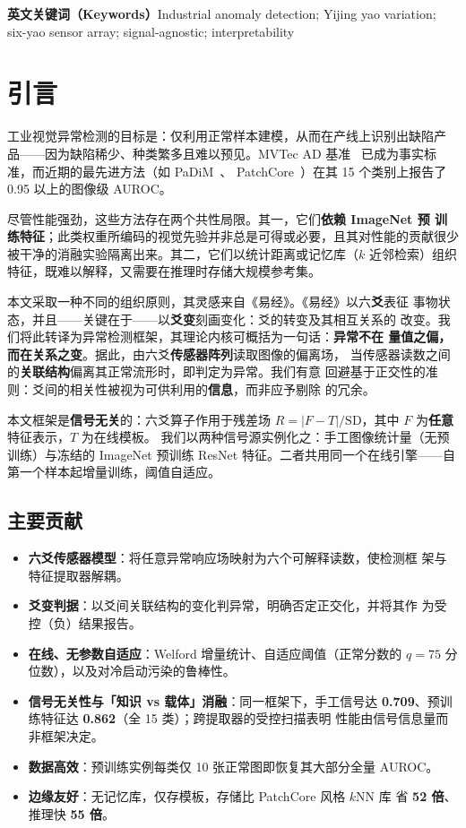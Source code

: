 \documentclass[journal,10pt]{IEEEtran}
\begin{document}
\noindent\textbf{英文关键词（Keywords）}\quad Industrial anomaly detection;
Yijing yao variation; six-yao sensor array; signal-agnostic; interpretability

\section{引言}
工业视觉异常检测的目标是：仅利用正常样本建模，从而在产线上识别出缺陷产
品——因为缺陷稀少、种类繁多且难以预见。MVTec AD 基准~\cite{bergmann2019mvtec}
已成为事实标准，而近期的最先进方法（如 PaDiM~\cite{defard2021padim}、
PatchCore~\cite{roth2022patchcore}）在其 15 个类别上报告了 0.95 以上的图像级
AUROC。

尽管性能强劲，这些方法存在两个共性局限。其一，它们\textbf{依赖 ImageNet 预
训练特征}；此类权重所编码的视觉先验并非总是可得或必要，且其对性能的贡献很少
被干净的消融实验隔离出来。其二，它们以统计距离或记忆库（$k$ 近邻检索）组织
特征，既难以解释，又需要在推理时存储大规模参考集。

本文采取一种不同的组织原则，其灵感来自《易经》。《易经》以六\textbf{爻}表征
事物状态，并且——关键在于——以\textbf{爻变}刻画变化：爻的转变及其相互关系的
改变。我们将此转译为异常检测框架，其理论内核可概括为一句话：\textbf{异常不在
量值之偏，而在关系之变}。据此，由六爻\textbf{传感器阵列}读取图像的偏离场，
当传感器读数之间的\textbf{关联结构}偏离其正常流形时，即判定为异常。我们有意
回避基于正交性的准则：爻间的相关性被视为可供利用的\textbf{信息}，而非应予剔除
的冗余。

本文框架是\textbf{信号无关}的：六爻算子作用于残差场
$R = |F - T| / \mathrm{SD}$，其中 $F$ 为\textbf{任意}特征表示，$T$ 为在线模板。
我们以两种信号源实例化之：手工图像统计量（无预训练）与冻结的 ImageNet 预训练
ResNet 特征。二者共用同一个在线引擎——自第一个样本起增量训练，阈值自适应。

\subsection{主要贡献}
\begin{itemize}
\item \textbf{六爻传感器模型}：将任意异常响应场映射为六个可解释读数，使检测框
架与特征提取器解耦。
\item \textbf{爻变判据}：以爻间关联结构的变化判异常，明确否定正交化，并将其作
为受控（负）结果报告。
\item \textbf{在线、无参数自适应}：Welford 增量统计、自适应阈值（正常分数的
$q{=}75$ 分位数），以及对冷启动污染的鲁棒性。
\item \textbf{信号无关性与「知识 vs 载体」消融}：同一框架下，手工信号达
\textbf{0.709}、预训练特征达 \textbf{0.862}（全 15 类）；跨提取器的受控扫描表明
性能由信号信息量而非框架决定。
\item \textbf{数据高效}：预训练实例每类仅 10 张正常图即恢复其大部分全量 AUROC。
\item \textbf{边缘友好}：无记忆库，仅存模板，存储比 PatchCore 风格 $k$NN 库
省 \textbf{52 倍}、推理快 \textbf{55 倍}。
\end{itemize}
\end{document}
